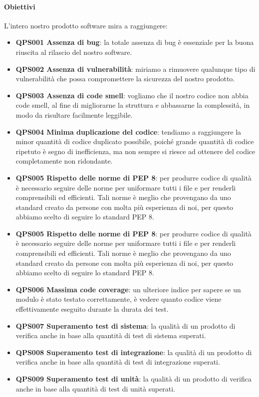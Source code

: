 		\paragraph{Obiettivi}
		L'intero nostro prodotto software mira a raggiungere:
		\begin{itemize}
			\item \textbf{QPS001 Assenza di bug}: la totale assenza di bug è essenziale per la buona riuscita al rilascio del nostro software.
			\item \textbf{QPS002 Assenza di vulnerabilità}: miriamo a rimuovere qualunque tipo di vulnerabilità che possa compromettere la sicurezza del nostro prodotto.
			\item \textbf{QPS003 Assenza di code smell}: vogliamo che il nostro codice non abbia code smell, al fine di migliorarne la struttura e abbassarne la complessità, in modo da risultare facilmente leggibile.
			\item \textbf{QPS004 Minima duplicazione del codice}: tendiamo a raggiungere la minor quantità di codice duplicato possibile, poiché grande quantità di codice ripetuto è segno di inefficienza, ma non sempre si riesce ad ottenere del codice completamente non ridondante.
            \item \textbf{QPS005 Rispetto delle norme di PEP 8}: per produrre codice di qualità è necessario seguire delle norme per uniformare tutti i file e per renderli comprensibili ed efficienti. Tali norme è meglio che provengano da uno standard creato da persone con molta più esperienza di noi, per questo abbiamo scelto di seguire lo standard PEP 8.
            \item \textbf{QPS005 Rispetto delle norme di PEP 8}: per produrre codice di qualità è necessario seguire delle norme per uniformare tutti i file e per renderli comprensibili ed efficienti. Tali norme è meglio che provengano da uno standard creato da persone con molta più esperienza di noi, per questo abbiamo scelto di seguire lo standard PEP 8.
            \item \textbf{QPS006 Massima code coverage}: un ulteriore indice per sapere se un modulo è stato testato correttamente, è vedere quanto codice viene effettivamente eseguito durante la durata dei test.
            \item \textbf{QPS007 Superamento test di sistema}: la qualità di un prodotto di verifica anche in base alla quantità di test di sistema superati.
            \item \textbf{QPS008 Superamento test di integrazione}: la qualità di un prodotto di verifica anche in base alla quantità di test di integrazione superati.
            \item \textbf{QPS009 Superamento test di unità}: la qualità di un prodotto di verifica anche in base alla quantità di test di unità superati.
		\end{itemize}


